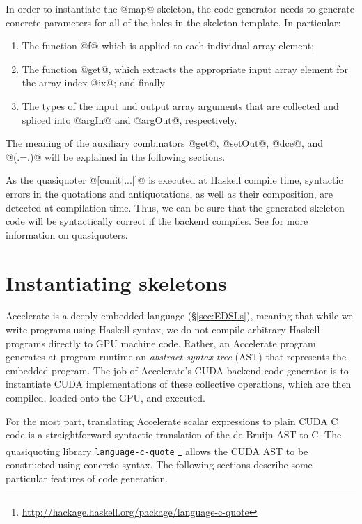 In order to instantiate the @map@ skeleton, the code generator needs to
generate concrete parameters for all of the holes in the skeleton template. In
particular:
%
\begin{enumerate}
\item The function @f@ which is applied to each individual array element;

\item The function @get@, which extracts the appropriate input array
    element for the array index @ix@; and finally

\item The types of the input and output array arguments that are collected and
    spliced into @argIn@ and @argOut@, respectively.

\end{enumerate}
%
The meaning of the auxiliary combinators @get@, @setOut@, @dce@, and @(.=.)@
will be explained in the following sections.

As the quasiquoter\qq{} @[cunit|...|]@ is executed at Haskell compile time,
syntactic errors in the quotations and antiquotations\aq{}, as well as their
composition, are detected at compilation time. Thus, we can be sure that the
generated skeleton code will be syntactically correct if the backend compiles.
See \cite{Mainland:2007bl} for more information on quasiquoters.


\section{Instantiating skeletons}
\label{sec:instantiating_skeletons}

\skeleton[|(]{}

Accelerate is a deeply embedded language (\S\ref{sec:EDSLs}), meaning that while we
write programs using Haskell syntax, we do not compile arbitrary Haskell
programs directly to GPU machine code. Rather, an Accelerate program generates
at program runtime an \emph{abstract syntax tree} (AST\AST{}) that represents
the embedded program.
The job of Accelerate's CUDA backend code generator is to instantiate CUDA
implementations of these collective operations, which are then compiled, loaded
onto the GPU, and executed.

For the most part, translating Accelerate scalar expressions to plain CUDA C
code is a straightforward syntactic translation of the de Bruijn AST
to C\@. The quasiquoting\qq{} library \texttt{language-c-quote}%
\footnote{\url{http://hackage.haskell.org/package/language-c-quote}} allows the
CUDA AST to be constructed using concrete syntax. The following sections
describe some particular features of code generation.


